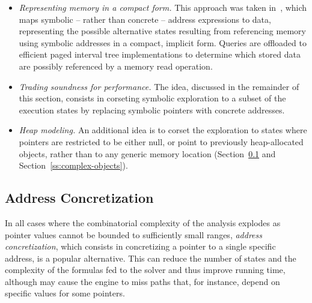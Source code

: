 \begin{itemize}
\item {\em Representing memory in a compact form.} This approach was taken in~\cite{MEMSIGHT-ASE17}, which maps symbolic -- rather than concrete -- address expressions to data, representing the possible alternative states resulting from referencing memory using symbolic addresses in a compact, implicit form. Queries are offloaded to efficient paged interval tree implementations to determine which stored data are possibly referenced by a memory read operation.

\item {\em Trading soundness for performance.} The idea, discussed in the remainder of this section, consists in corseting symbolic exploration to a subset of the execution states by replacing symbolic pointers with concrete addresses.

\item {\em Heap modeling.} An additional idea is to corset the exploration to states where pointers are restricted to be either null, or point to previously heap-allocated objects, rather than to any generic memory location (Section~\ref{ss:address-concretization} and Section~\ref{ss:complex-objects}).
\end{itemize}


\subsection{Address Concretization}
\label{ss:address-concretization}

In all cases where the combinatorial complexity of the analysis explodes as pointer values cannot be bounded to sufficiently small ranges, {\em address concretization}, which consists in concretizing a pointer to a single specific address, is a popular alternative. This can reduce the number of states and the complexity of the formulas fed to the solver and thus improve running time, although may cause the engine to miss paths that, for instance, depend on specific values for some pointers. 





